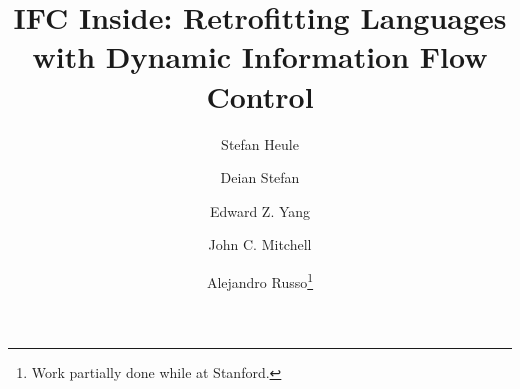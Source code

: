 \documentclass{llncs}
\newif\ifextended
\begin{document}
\newcommand{\flows}{\sqsubseteq}
\newcommand{\lub}{\sqcup}
\newcommand{\glb}{\sqcap}



\newcommand{\ifc}[1]{\ensuremath{{\color{blue} #1}}}
\newcommand{\lcurr}{\ensuremath{\ifc{l_{\textrm{cur}}}}}











































\newcommand{\tar}[1]{\ensuremath{\mathbf{\color{red} #1}}}













\newcommand{\Coloneqq}{::=} 

\newcommand{\dom}[1]{\ensuremath{{\textrm{dom}} #1}}
\newcommand{\fresh}[1]{\ensuremath{\textrm{fresh}(#1)}}




























\title{
IFC Inside: Retrofitting Languages with Dynamic Information Flow Control
}
\ifextended
\subtitle{Extended Version}
\fi


\author{
 Stefan Heule \and
 Deian Stefan \and
 Edward Z. Yang \and
 John C. Mitchell \and
 Alejandro Russo\protect\footnote{Work partially done while at Stanford.}
}
\end{document}
